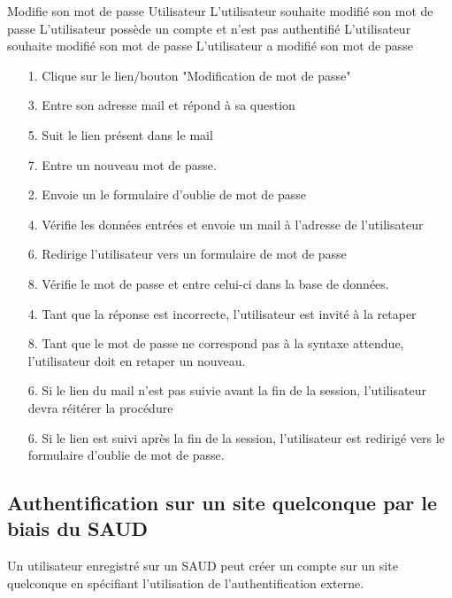 \documentclass[a4paper,11pt,french]{article}
\begin{document}
\fiche
	{Modifie son mot de passe}
	{Utilisateur}
	{L'utilisateur souhaite modifié son mot de passe}
	{L'utilisateur possède un compte et n'est pas authentifié}
	{L'utilisateur souhaite modifié son mot de passe}
	{L'utilisateur a modifié son mot de passe}
	{\begin{itemize}
	    \item[]
		\item[1.] Clique sur le lien/bouton "Modification de mot de
passe"
        \item[3.] Entre son adresse mail et répond à sa question
        \item[5.] Suit le lien présent dans le mail
        \item[7.] Entre un nouveau mot de passe.
	\end{itemize}
	}
	{\begin{itemize}
        \item[]
		\item[2.] Envoie un le formulaire d'oublie de mot de passe
		\item[4.] Vérifie les données entrées et envoie un mail à l'adresse de 
		l'utilisateur
		\item[6.] Redirige l'utilisateur vers un formulaire de mot de passe
		\item[8.] Vérifie le mot de passe et entre celui-ci dans la base de 
		données.
	\end{itemize}
	}
	{}
\flots
    {\begin{itemize}
    \item[]
    \item[4.] Tant que la réponse est incorrecte, l'utilisateur est invité à la
    retaper
    \item[8.] Tant que le mot de passe ne correspond pas à la syntaxe attendue,
     l'utilisateur doit en retaper un nouveau.
    \end{itemize}
    }
	{\begin{itemize}
	\item[]
	\item[6.] Si le lien du mail n'est pas suivie avant la fin de la session, 
	l'utilisateur devra réitérer la procédure
	\item[6.] Si le lien est suivi après la fin de la session, l'utilisateur est
	redirigé vers le formulaire d'oublie de mot de passe.
	\end{itemize}
	}

\subsection{Authentification sur un site quelconque par le biais du SAUD}
Un utilisateur enregistré sur un SAUD peut créer un compte sur un site quelconque
en spécifiant l'utilisation de l'authentification externe.
\end{document}
